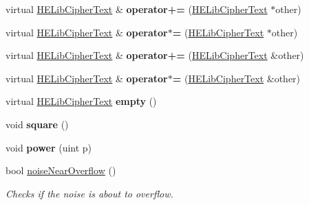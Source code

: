 \begin{DoxyCompactItemize}
\mbox{\label{classHELibCipherText_ae27121fd664b3035d439df0dcc1a260f}} 
virtual \hyperlink{classHELibCipherText}{H\+E\+Lib\+Cipher\+Text} \& {\bfseries operator+=} (\hyperlink{classHELibCipherText}{H\+E\+Lib\+Cipher\+Text} $\ast$other)
\item 
\mbox{\label{classHELibCipherText_ab6377e4bf0d41afdf197a1a5d71e962a}} 
virtual \hyperlink{classHELibCipherText}{H\+E\+Lib\+Cipher\+Text} \& {\bfseries operator$\ast$=} (\hyperlink{classHELibCipherText}{H\+E\+Lib\+Cipher\+Text} $\ast$other)
\item 
\mbox{\label{classHELibCipherText_a4e7fa1f2a1ea50b93ce11b4b4f8c2e03}} 
virtual \hyperlink{classHELibCipherText}{H\+E\+Lib\+Cipher\+Text} \& {\bfseries operator+=} (\hyperlink{classHELibCipherText}{H\+E\+Lib\+Cipher\+Text} \&other)
\item 
\mbox{\label{classHELibCipherText_a716cb0493c84fa579f4832af4a526aa3}} 
virtual \hyperlink{classHELibCipherText}{H\+E\+Lib\+Cipher\+Text} \& {\bfseries operator$\ast$=} (\hyperlink{classHELibCipherText}{H\+E\+Lib\+Cipher\+Text} \&other)
\item 
\mbox{\label{classHELibCipherText_a1c15638ff87af1b47284bd989f1d5ae8}} 
virtual \hyperlink{classHELibCipherText}{H\+E\+Lib\+Cipher\+Text} {\bfseries empty} ()
\item 
\mbox{\label{classHELibCipherText_a5f22ca53fc9eecbe4832a1825a5de743}} 
void {\bfseries square} ()
\item 
\mbox{\label{classHELibCipherText_ad54baf34b1a02a1d612c06fc4161a8ee}} 
void {\bfseries power} (uint p)
\item 
\mbox{\label{classHELibCipherText_ad55e5d6fa479d459ffc9e55232e511f5}} 
bool \hyperlink{classHELibCipherText_ad55e5d6fa479d459ffc9e55232e511f5}{noise\+Near\+Overflow} ()
\begin{DoxyCompactList}\small\item\em Checks if the noise is about to overflow. \end{DoxyCompactList}\end{DoxyCompactItemize}
